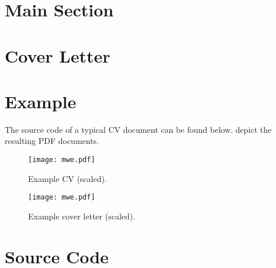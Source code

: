 \documentclass{ltxdoc}
\begin{document}
\section{Main Section}

\section{Cover Letter}

\section{Example}

  The source code of a typical CV document can be found below.  depict the resulting PDF documents.

  \begin{figure}[!ht]
    \texttt{[image: mwe.pdf]}
    \caption{Example CV (scaled).}
    \label{example-cv}
  \end{figure}

  \begin{figure}[!ht]
    \texttt{[image: mwe.pdf]}
    \caption{Example cover letter (scaled).}
    \label{example-cover-letter}
  \end{figure}

  

\section{Source Code}


\end{document}
